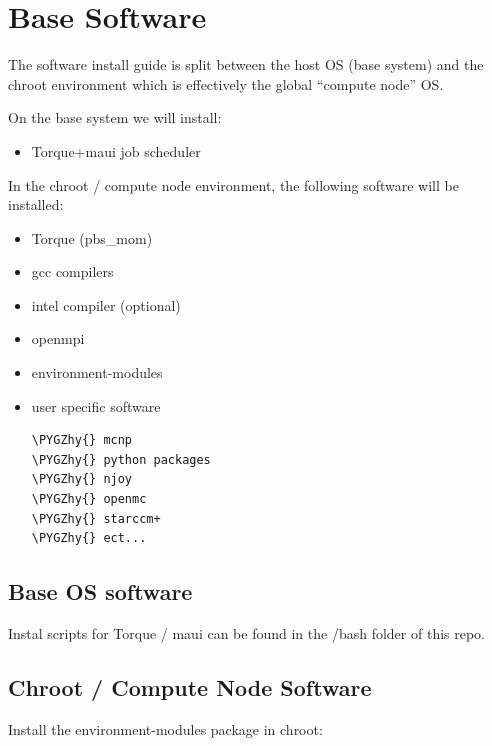 \documentclass[letterpaper,10pt,english]{sphinxmanual}
\def\PYGZhy{\char`\-}
\begin{document}
\chapter{Base Software}
\label{software_setup:base-software}\label{software_setup::doc}
The software install guide is split between the host OS (base system) and the chroot environment
which is effectively the global ``compute node'' OS.

On the base system we will install:
\begin{itemize}
\item {} 
Torque+maui job scheduler

\end{itemize}

In the chroot / compute node environment, the following software will be installed:
\begin{itemize}
\item {} 
Torque (pbs\_mom)

\item {} 
gcc compilers

\item {} 
intel compiler (optional)

\item {} 
openmpi

\item {} 
environment-modules

\item {} 
user specific software

\begin{Verbatim}[commandchars=\\\{\}]
\PYGZhy{} mcnp
\PYGZhy{} python packages
\PYGZhy{} njoy
\PYGZhy{} openmc
\PYGZhy{} starccm+
\PYGZhy{} ect...
\end{Verbatim}

\end{itemize}


\section{Base OS software}
\label{software_setup:base-os-software}
Instal scripts for Torque / maui can be found in the /bash folder of this repo.


\section{Chroot / Compute Node Software}
\label{software_setup:chroot-compute-node-software}
Install the environment-modules package in chroot:
\end{document}
